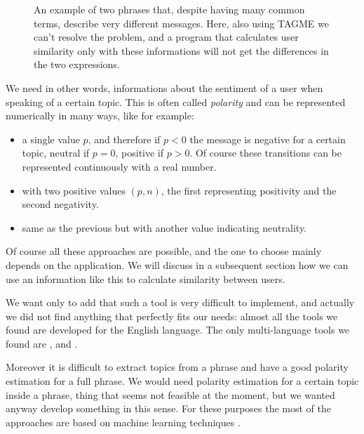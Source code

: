 \documentclass[a4paper,11pt,oneside]{article}
\begin{document}
\begin{figure}[h]
\caption{An example of two phrases that, despite having many common terms, describe very different messages.
Here, also using TAGME we can't resolve the problem, and a program that calculates user similarity only with these informations will not get the differences in the two expressions.}
\end{figure}

We need in other words, informations about the sentiment of a user when speaking of a certain topic. This is often called \textit{polarity} and can be represented numerically in many ways, like for example: 
\begin{itemize}
\item a single value $p$, and therefore if $p < 0$ the message is negative for a certain topic, neutral if $p = 0$, positive if $p > 0$. Of course these transitions can be represented continuously with a real number.
\item with two positive values $(p,n)$, the first representing positivity and the second negativity.
\item same as the previous but with another value indicating neutrality.
\end{itemize}

Of course all these approaches are possible, and the one to choose mainly depends on the application. We will discuss in a subsequent section how we can use an information like this to calculate similarity between users.

We want only to add that such a tool is very difficult to implement, and actually we did not find anything that perfectly fits our needs: almost all the tools we found are developed for the English language. The only multi-language tools we found are \cite{sentiment}, \cite{tromp} and \cite{Kin}.

Moreover it is difficult to extract topics from a phrase and have a good polarity estimation for a full phrase. We would need polarity estimation for a certain topic inside a phrase, thing that seems not feasible at the moment, but we wanted anyway develop something in this sense.
For these purposes the most of the approaches are based on machine learning techniques \cite{sentiment, baccianella}.
\end{document}
